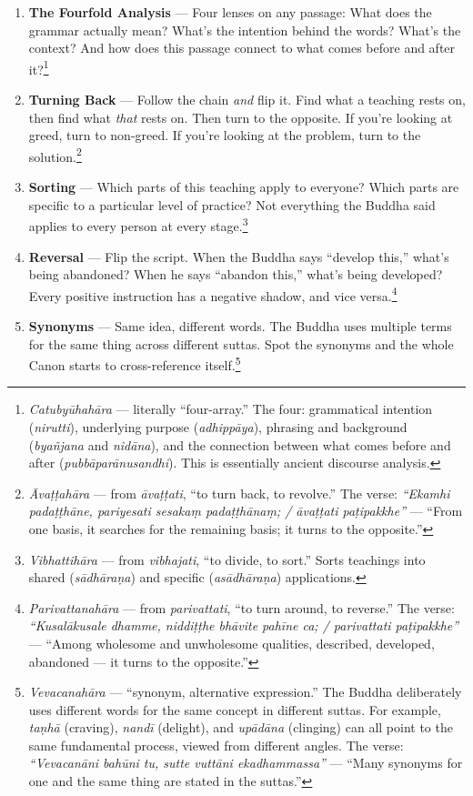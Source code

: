 \begin{enumerate}[leftmargin=*, itemsep=8pt]
\item \textbf{The Fourfold Analysis} --- Four lenses on any passage: What does the grammar actually mean? What's the intention behind the words? What's the context? And how does this passage connect to what comes before and after it?\footnote{\textit{Catubyūhahāra} --- literally ``four-array.'' The four: grammatical intention (\textit{nirutti}), underlying purpose (\textit{adhippāya}), phrasing and background (\textit{byañjana} and \textit{nidāna}), and the connection between what comes before and after (\textit{pubbāparānusandhi}). This is essentially ancient discourse analysis.}

\item \textbf{Turning Back} --- Follow the chain \textit{and} flip it. Find what a teaching rests on, then find what \textit{that} rests on. Then turn to the opposite. If you're looking at greed, turn to non-greed. If you're looking at the problem, turn to the solution.\footnote{\textit{Āvaṭṭahāra} --- from \textit{āvaṭṭati}, ``to turn back, to revolve.'' The verse: \textit{``Ekamhi padaṭṭhāne, pariyesati sesakaṃ padaṭṭhānaṃ; / āvaṭṭati paṭipakkhe''} --- ``From one basis, it searches for the remaining basis; it turns to the opposite.''}

\item \textbf{Sorting} --- Which parts of this teaching apply to everyone? Which parts are specific to a particular level of practice? Not everything the Buddha said applies to every person at every stage.\footnote{\textit{Vibhattihāra} --- from \textit{vibhajati}, ``to divide, to sort.'' Sorts teachings into shared (\textit{sādhāraṇa}) and specific (\textit{asādhāraṇa}) applications.}

\item \textbf{Reversal} --- Flip the script. When the Buddha says ``develop this,'' what's being abandoned? When he says ``abandon this,'' what's being developed? Every positive instruction has a negative shadow, and vice versa.\footnote{\textit{Parivattanahāra} --- from \textit{parivattati}, ``to turn around, to reverse.'' The verse: \textit{``Kusalākusale dhamme, niddiṭṭhe bhāvite pahīne ca; / parivattati paṭipakkhe''} --- ``Among wholesome and unwholesome qualities, described, developed, abandoned --- it turns to the opposite.''}

\item \textbf{Synonyms} --- Same idea, different words. The Buddha uses multiple terms for the same thing across different suttas. Spot the synonyms and the whole Canon starts to cross-reference itself.\footnote{\textit{Vevacanahāra} --- ``synonym, alternative expression.'' The Buddha deliberately uses different words for the same concept in different suttas. For example, \textit{taṇhā} (craving), \textit{nandī} (delight), and \textit{upādāna} (clinging) can all point to the same fundamental process, viewed from different angles. The verse: \textit{``Vevacanāni bahūni tu, sutte vuttāni ekadhammassa''} --- ``Many synonyms for one and the same thing are stated in the suttas.''}


\end{enumerate}
